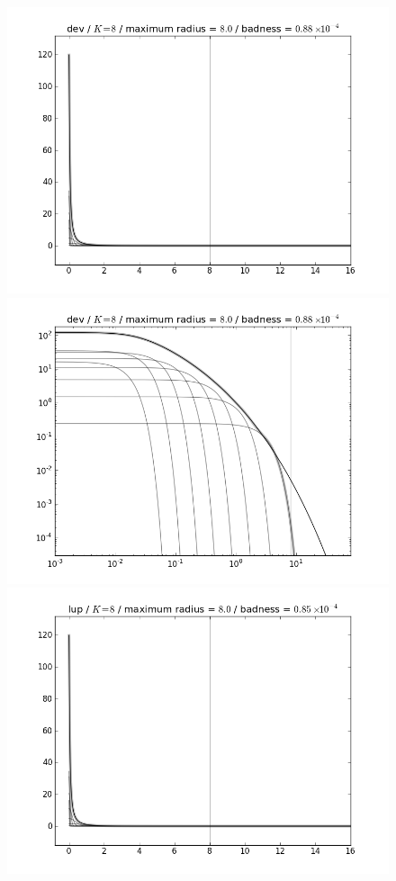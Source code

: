 \documentclass[12pt,pdftex,preprint]{aastex}
\newlength{\figwidth}
\begin{document}
\clearpage
\begin{figure}
\includegraphics[width=\figwidth]{K08_MR08_LSD04_dev.png}
\includegraphics[width=\figwidth]{K08_MR08_LSD04_dev_log.png} \\
\includegraphics[width=\figwidth]{K08_MR08_LSD04_lup.png}

\end{figure}
\end{document}

